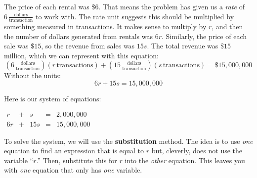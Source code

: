\documentclass[nooutcomes]{ximera}
\begin{document}
\begin{example}
\begin{explanation}
  The price of each rental was $\$6$.
        That means the problem has given us a \textit{rate}
        of $6\,\frac{\text{dollars}}{\text{transaction}}$ to work with.
        The rate unit suggests this should be multiplied by something measured in transactions.
        It makes sense to multiply by $r$,
        and then the number of dollars generated from rentals was $6r$.
        Similarly, the price of each sale was $\$15$,
        so the revenue from sales was $15s$.
        The total revenue was $\$15$ million,
        which we can represent with this equation:
$$
          \left(6\,\tfrac{\text{dollars}}{\text{transaction}}\right)(r\,\text{transactions})+\left(15\,\tfrac{\text{dollars}}{\text{transaction}}\right)(s\,\text{transactions})=\$15{,}000{,}000
$$
        Without the units:
    $$
          6r+15s=15{,}000{,}000
     $$

        Here is our system of equations:
\begin{center}
  $
          \begin{array}{ccccc}
          r&+& s&=&2{,}000{,}000 \\
          6r&+& 15s&=&15{,}000{,}000
          \end{array}
$
       \end{center}
        To solve the system, we will use the
        \textbf{substitution} method.
        The idea is to use \textit{one}
        equation to find an expression that is equal to $r$ but,
        cleverly, does not use the variable ``$r$.'' Then,
        substitute this for $r$ into the
        \textit{other} equation.
        This leaves you with \textit{one}
        equation that only has \textit{one} variable.


\end{explanation}
\end{example}
\end{document}
